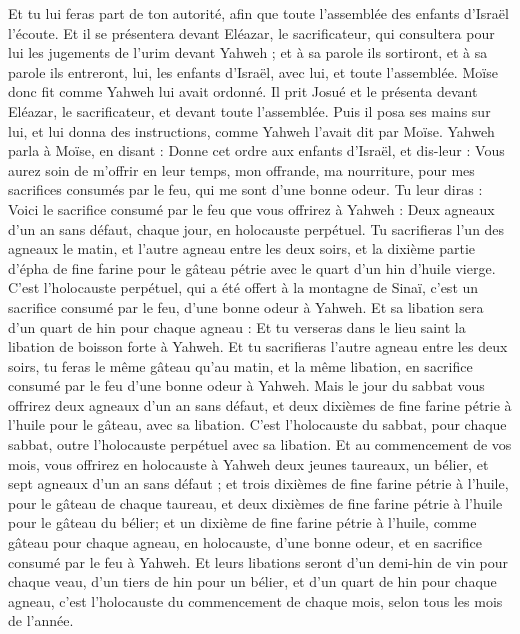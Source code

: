 \begin{multicols}{2}
Et tu lui feras part de ton autorité, afin que toute l'assemblée des enfants d'Israël l'écoute.
Et il se présentera devant Eléazar, le sacrificateur, qui consultera pour lui les jugements de l'urim devant Yahweh ; et à sa parole ils sortiront, et à sa parole ils entreront, lui, les enfants d'Israël, avec lui, et toute l'assemblée.
Moïse donc fit comme Yahweh lui avait ordonné. Il prit Josué et le présenta devant Eléazar, le sacrificateur, et devant toute l'assemblée.
Puis il posa ses mains sur lui, et lui donna des instructions, comme Yahweh l'avait dit par Moïse.
\VerseOne{}Yahweh parla à Moïse, en disant :
Donne cet ordre aux enfants d'Israël, et dis-leur : Vous aurez soin de m'offrir en leur temps, mon offrande, ma nourriture, pour mes sacrifices consumés par le feu, qui me sont d'une bonne odeur.
Tu leur diras : Voici le sacrifice consumé par le feu que vous offrirez à Yahweh : Deux agneaux d'un an sans défaut, chaque jour, en holocauste perpétuel.
Tu sacrifieras l'un des agneaux le matin, et l'autre agneau entre les deux soirs,
et la dixième partie d'épha de fine farine pour le gâteau pétrie avec le quart d'un hin d'huile vierge.
C'est l'holocauste perpétuel, qui a été offert à la montagne de Sinaï, c'est un sacrifice consumé par le feu, d'une bonne odeur à Yahweh.
Et sa libation sera d'un quart de hin pour chaque agneau : Et tu verseras dans le lieu saint la libation de boisson forte à Yahweh.
Et tu sacrifieras l'autre agneau entre les deux soirs, tu feras le même gâteau qu'au matin, et la même libation, en sacrifice consumé par le feu d'une bonne odeur à Yahweh.
Mais le jour du sabbat vous offrirez deux agneaux d'un an sans défaut, et deux dixièmes de fine farine pétrie à l'huile pour le gâteau, avec sa libation.
C'est l'holocauste du sabbat, pour chaque sabbat, outre l'holocauste perpétuel avec sa libation.
Et au commencement de vos mois, vous offrirez en holocauste à Yahweh deux jeunes taureaux, un bélier, et sept agneaux d'un an sans défaut ;
et trois dixièmes de fine farine pétrie à l'huile, pour le gâteau de chaque taureau, et deux dixièmes de fine farine pétrie à l'huile pour le gâteau du bélier;
et un dixième de fine farine pétrie à l'huile, comme gâteau pour chaque agneau, en holocauste, d'une bonne odeur, et en sacrifice consumé par le feu à Yahweh.
Et leurs libations seront d'un demi-hin de vin pour chaque veau, d'un tiers de hin pour un bélier, et d'un quart de hin pour chaque agneau, c'est l'holocauste du commencement de chaque mois, selon tous les mois de l'année.

\end{multicols}
